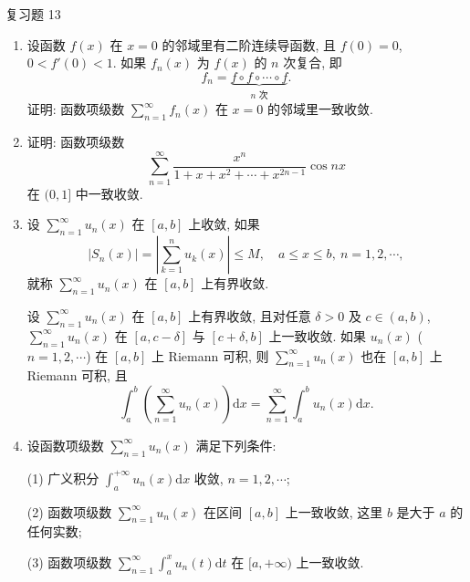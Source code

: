 
\begin{exblock}{复习题 13}
\begin{enumerate}
  \item 设函数 $f(x)$ 在 $x=0$ 的邻域里有二阶连续导函数, 且 $f(0)=0$, $0<f'(0)<1$. 如果 $f_{n}(x)$ 为 $f(x)$ 的 $n$ 次复合, 即
  \[
    f_{n}=\underbrace{f\circ f\circ\cdots\circ f}_{n\text{ 次}}.
\]
  证明: 函数项级数 $\sum_{n=1}^{\infty}f_{n}(x)$ 在 $x=0$ 的邻域里一致收敛.
  \item 证明: 函数项级数
  \[
    \sum_{n=1}^{\infty}\frac{x^{n}}{1+x+x^{2}+\cdots+x^{2n-1}}\cos nx
\]
  在 $(0,1]$ 中一致收敛.
  \item 设 $\sum_{n=1}^{\infty}u_{n}(x)$ 在 $[a,b]$ 上收敛, 如果
  \[
    |S_{n}(x)|=\left|\sum_{k=1}^{n}u_{k}(x)\right|\leqslant M,\quad a\leqslant x\leqslant b,\ n=1,2,\cdots,
\]
  就称 $\sum_{n=1}^{\infty}u_{n}(x)$ 在 $[a,b]$ 上有界收敛.

  设 $\sum_{n=1}^{\infty}u_{n}(x)$ 在 $[a,b]$ 上有界收敛, 且对任意 $\delta>0$ 及 $c\in(a,b)$, $\sum_{n=1}^{\infty}u_{n}(x)$ 在 $[a,c-\delta]$ 与 $[c+\delta,b]$ 上一致收敛. 如果 $u_{n}(x)$ ($n=1,2,\cdots$) 在 $[a,b]$ 上 Riemann 可积, 则 $\sum_{n=1}^{\infty}u_{n}(x)$ 也在 $[a,b]$ 上 Riemann 可积, 且
  \[
    \int_{a}^{b}\left(\sum_{n=1}^{\infty}u_{n}(x)\right)\mathrm{d}x=\sum_{n=1}^{\infty}\int_{a}^{b}u_{n}(x)\mathrm{d}x.
\]
  \item 设函数项级数 $\sum_{n=1}^{\infty}u_{n}(x)$ 满足下列条件:

  (1) 广义积分 $\int_{a}^{+\infty}u_{n}(x)\mathrm{d}x$ 收敛, $n=1,2,\cdots$;

  (2) 函数项级数 $\sum_{n=1}^{\infty}u_{n}(x)$ 在区间 $[a,b]$ 上一致收敛, 这里 $b$ 是大于 $a$ 的任何实数;

  (3) 函数项级数 $\sum_{n=1}^{\infty}\int_{a}^{x}u_{n}(t)\mathrm{d}t$ 在 $[a,+\infty)$ 上一致收敛.


\end{enumerate}
\end{exblock}
